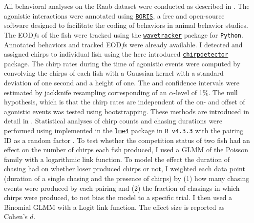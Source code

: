 All behavioral analyses on the Raab dataset were conducted as described in
\textcite{raabElectrocommunicationSignalsIndicate2021}. The agonistic
interactions were annotated using
\href{https://github.com/olivierfriard/BORIS}{\texttt{BORIS}}, a free and
open-source software designed to facilitate the coding of behaviors in animal
behavior studies. The EOD$f$s of the fish were tracked using the
\href{https://github.com/tillraab/wavetracker}{\texttt{wavetracker}} package
for \texttt{Python}. Annotated behaviors and tracked EOD$f$s were already
available. I detected and assigned chirps to individual fish using the here
introduced
\href{https://github.com/weygoldt/chirpdetector/}{\texttt{chirpdetector}}
package. The chirp rates during the time of agonistic events were computed by
convolving the chirps of each fish with a Gaussian kernel with a standard
deviation of one second and a height of one. The  and
 confidence intervals were estimated by jackknife resampling
corresponding of an $\alpha$-level of 1\%. The null hypothesis, which is that
the chirp rates are independent of the on- and offset of agonistic events was
tested using bootstrapping. These methods are introduced in detail in
\textcite{raabElectrocommunicationSignalsIndicate2021}. Statistical analyses of
chirp counts and chasing durations were performed using 
implemented in the
\href{https://cran.r-project.org/web/packages/lme4/index.html}{\texttt{lme4}}
package in \texttt{R v4.3.3} with the pairing ID as a random factor
\parencite{batesFittingLinearMixedEffects2015}. To test whether the competition
status of two fish had an effect on the number of chirps each fish produced, I
used a GLMM of the Poisson family with a logarithmic link function. To model
the effect the duration of chasing had on whether loser produced chirps or not,
I weighted each data point (duration of a single chasing and the presence of
chirps) by (1) how many chasing events were produced by each pairing and (2)
the fraction of chasings in which chirps were produced, to not bias the model
to a specific trial. I then used a Binomial GLMM with a Logit link function.
The effect size is reported as Cohen's $d$. 

